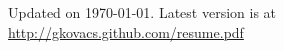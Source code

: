\documentclass[margin,line]{resume}
\begin{document}
\begin{resume}
\vspace{-3mm}

\begin{small}
\begin{center}
Updated on \today. Latest version is at \url{http://gkovacs.github.com/resume.pdf}
\end{center}
\end{small}

\end{resume}
\end{document}

